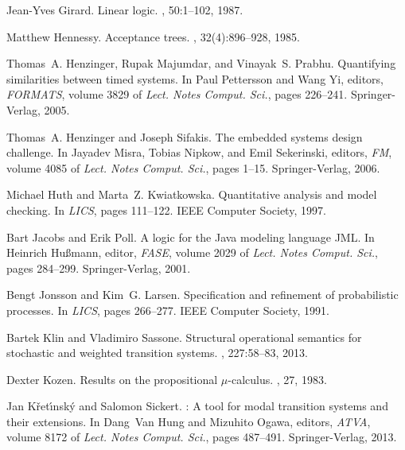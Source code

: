 \documentclass[twocolumn]{svjour3-dummy}
\begin{document}
\begin{thebibliography}{10}
Jean-Yves Girard.
\newblock Linear logic.
, 50:1--102, 1987.

Matthew Hennessy.
\newblock Acceptance trees.
, 32(4):896--928, 1985.

Thomas~A. Henzinger, Rupak Majumdar, and Vinayak~S. Prabhu.
\newblock Quantifying similarities between timed systems.
\newblock In Paul Pettersson and Wang Yi, editors, {\em FORMATS}, volume 3829
  of {\em {Lect. Notes Comput. Sci.}}, pages 226--241. {Springer-Verlag}, 2005.

Thomas~A. Henzinger and Joseph Sifakis.
\newblock The embedded systems design challenge.
\newblock In Jayadev Misra, Tobias Nipkow, and Emil Sekerinski, editors, {\em
  FM}, volume 4085 of {\em {Lect. Notes Comput. Sci.}}, pages 1--15.
  {Springer-Verlag}, 2006.

Michael Huth and Marta~Z. Kwiatkowska.
\newblock Quantitative analysis and model checking.
\newblock In {\em LICS}, pages 111--122. IEEE Computer Society, 1997.

Bart Jacobs and Erik Poll.
\newblock A logic for the {J}ava modeling language {JML}.
\newblock In Heinrich Hu{\ss}mann, editor, {\em FASE}, volume 2029 of {\em
  {Lect. Notes Comput. Sci.}}, pages 284--299. {Springer-Verlag}, 2001.

Bengt Jonsson and Kim~G. Larsen.
\newblock Specification and refinement of probabilistic processes.
\newblock In {\em LICS}, pages 266--277. IEEE Computer Society, 1991.

Bartek Klin and Vladimiro Sassone.
\newblock Structural operational semantics for stochastic and weighted
  transition systems.
, 227:58--83, 2013.

Dexter Kozen.
\newblock Results on the propositional $\mu$-calculus.
, 27, 1983.

Jan K{\v r}et\'{\i}nsk{\'y} and Salomon Sickert.
: A tool for modal transition systems and their extensions.
\newblock In Dang~Van Hung and Mizuhito Ogawa, editors, {\em ATVA}, volume 8172
  of {\em {Lect. Notes Comput. Sci.}}, pages 487--491. {Springer-Verlag}, 2013.


\end{thebibliography}
\end{document}

